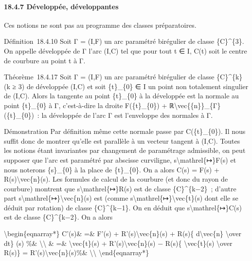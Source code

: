 \documentclass[]{article}
\begin{document}
\paragraph{18.4.7 Développée, développantes}

Ces notions ne sont pas au programme des classes préparatoires.

Définition~18.4.10 Soit Γ = (I,F) un arc paramétré birégulier de classe
\{C\}\^{}\{3\}. On appelle développée de Γ l'arc (I,C) tel que pour tout
t ∈ I, C(t) soit le centre de courbure au point t à Γ.

Théorème~18.4.17 Soit Γ = (I,F) un arc paramétré birégulier de classe
\{C\}\^{}\{k\} (k ≥ 3) de développée (I,C) et soit \{t\}\_\{0\} ∈ I un
point non totalement singulier de (I,C). Alors la tangente au point
\{t\}\_\{0\} à la développée est la normale au point \{t\}\_\{0\} à Γ,
c'est-à-dire la droite F(\{t\}\_\{0\}) +
ℝ\textbackslash{}vec\{\{n\}\}\_\{Γ\}(\{t\}\_\{0\})~: la développée de
l'arc Γ est l'enveloppe des normales à Γ.

Démonstration Par définition même cette normale passe par
C(\{t\}\_\{0\}). Il nous suffit donc de montrer qu'elle est parallèle à
un vecteur tangent à (I,C). Toutes les notions étant invariantes par
changement de paramétrage admissible, on peut supposer que l'arc est
paramétré par abscisse curviligne, s\textbackslash{}mathrel\{↦\}F(s) et
nous noterons \{s\}\_\{0\} à la place de \{t\}\_\{0\}. On a alors C(s) =
F(s) + R(s)\textbackslash{}vec\{n\}(s). Les formules de calcul de la
courbure (et donc du rayon de courbure) montrent que
s\textbackslash{}mathrel\{↦\}R(s) est de classe \{C\}\^{}\{k−2\}~;
d'autre part s\textbackslash{}mathrel\{↦\}\textbackslash{}vec\{n\}(s)
est (comme s\textbackslash{}mathrel\{↦\}\textbackslash{}vec\{t\}(s) dont
elle se déduit par rotation) de classe \{C\}\^{}\{k−1\}. On en déduit
que s\textbackslash{}mathrel\{↦\}C(s) est de classe \{C\}\^{}\{k−2\}. On
a alors

\textbackslash{}begin\{eqnarray*\} C'(s)\& =\& F'(s) +
R'(s)\textbackslash{}vec\{n\}(s) + R(s)\{ d\textbackslash{}vec\{n\}
\textbackslash{}over dt\} (s) \%\& \textbackslash{}\textbackslash{} \&
=\& \textbackslash{}vec\{t\}(s) + R'(s)\textbackslash{}vec\{n\}(s) −
R(s)\{ \textbackslash{}vec\{t\}(s) \textbackslash{}over R(s)\} =
R'(s)\textbackslash{}vec\{n\}(s)\%\& \textbackslash{}\textbackslash{}
\textbackslash{}end\{eqnarray*\}
\end{document}

